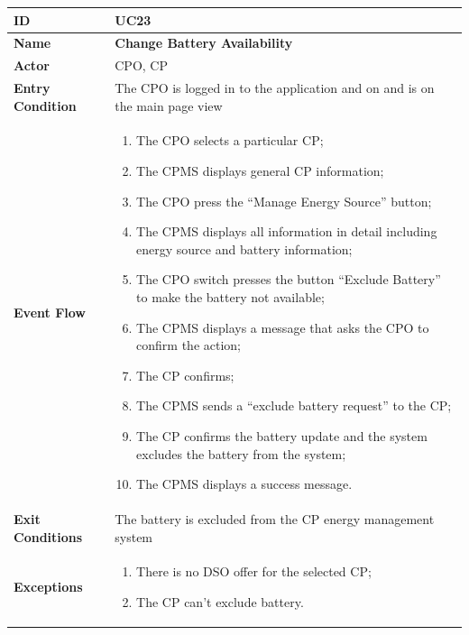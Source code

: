 \documentclass{Configuration_Files/PoliMi3i_thesis}
\begin{document}
\begin{table}[H]
    \begin{xltabular}{\textwidth}{| >{}l | X |}
    \hline
    \textbf{ID} & \textbf{UC23}\T\B\\
    \hline
    \textbf{Name} & \textbf{Change Battery Availability}\T\B\\
    \hline \hline
    \textbf{Actor} & CPO, CP\T\B \\
    \hline
    \textbf{Entry Condition} & The CPO is logged in to the application and on and is on the main page view\T\B\\
    \hline
    \textbf{Event Flow} & 
        \begin{enumerate}
        \item The CPO selects a particular CP;
        \item The CPMS displays general CP information;
        \item The CPO press the “Manage Energy Source” button;
        \item The CPMS displays all information in detail including energy source and battery information;
        \item The CPO switch presses the button “Exclude Battery” to make the battery not available;
        \item The CPMS displays a message that asks the CPO to confirm the action;
        \item The CP confirms;
        \item The CPMS sends a “exclude battery request” to the CP;
        \item The CP confirms the battery update and the system excludes the battery from the system;
        \item The CPMS displays a success message.
        \end{enumerate}\B\\
    \hline
    \textbf{Exit Conditions} & The battery is excluded from the CP energy management system\B\\
    \hline
    \textbf{Exceptions} & \begin{enumerate}
        \item There is no DSO offer for the selected CP;
        \item The CP can’t exclude battery.
        \end{enumerate}\B\\
    \hline
    \end{xltabular}
\end{table}
\end{document}
